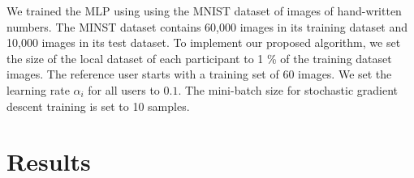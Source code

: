 \documentclass[conference]{IEEEtran}
\begin{document}
We trained the MLP using using the MNIST dataset of images of hand-written  numbers\cite{deng2012mnist}. 
The MINST dataset contains 60,000 images in its training dataset and 10,000 images in its test dataset.
To implement our proposed algorithm, we set the size of the local dataset of each participant to 1 \% of the training dataset
images. The reference user starts with a training set of 60 images.
We set the learning rate $\alpha_i$ for all users to $0.1$.  The mini-batch size for stochastic gradient
descent training is set to 10 samples.

\section{Results}

% 




\end{document}
